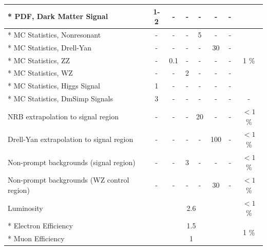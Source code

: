 \begin{table}[htb]
{\begin{tabular}{lccccccc}
* PDF, Dark Matter Signal                      & 1-2        & -          & -          & -           & -          & -          &            \\
\hline
* MC Statistics, Nonresonant                   & -          & -          & -          & 5           & -          & -          & \multirow{5}{*}{1 \%}  \\
* MC Statistics, Drell-Yan                     & -          & -          & -          & -           & 30         & -          &            \\
* MC Statistics, ZZ                            & -          & 0.1        & -          & -           & -          & -          &            \\
* MC Statistics, WZ                            & -          & -          & 2          & -           & -          & -          &            \\
* MC Statistics, Higgs Signal                  & 1          & -          & -          & -           & -          & -          &            \\
* MC Statistics, DmSimp Signals                & 3          & -          & -          & -           & -          & -          & -          \\
\hline
NRB extrapolation to signal region             & -          & -          & -          & 20          & -          & -          & $<1$ \%       \\
Drell-Yan extrapolation to signal region       & -          & -          & -          & -           & 100        & -          & $<1$ \%       \\
Non-prompt backgrounds (signal region)         & -          & -          & 3          & -           & -          & -          & $<1$ \%       \\
Non-prompt backgrounds (WZ control region)     & -          & -          & -          & -           & 30         & -          & $<1$ \%       \\
\hline                                                                                                                              
Luminosity                                     & \multicolumn{6}{c}{2.6}                                                      & $<1$ \%        \\
\hline
* Electron Efficiency                          & \multicolumn{6}{c}{1.5}                                                      & \multirow{9}{*}{1 \%}  \\
* Muon Efficiency                              & \multicolumn{6}{c}{1}                                                        &           \\

\end{tabular}}
\end{table}
